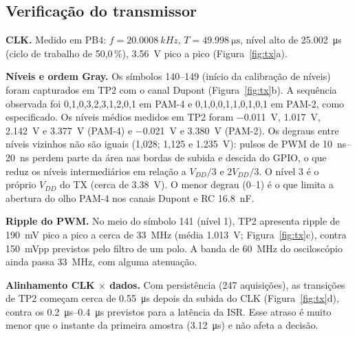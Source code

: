 \documentclass[12pt,a4paper]{article}
\begin{document}
\subsection{Verificação do transmissor}

\textbf{CLK.} Medido em PB4: $f = \SI{20,0008}{kHz}$, $T = \SI{49,998}{\micro\second}$, nível
alto de \SI{25,002}{\micro\second} (ciclo de trabalho de 50,0\,\%), \SI{3,56}{V} pico a pico
(Figura~\ref{fig:tx}a).

\textbf{Níveis e ordem Gray.} Os símbolos 140--149 (início da calibração de níveis) foram capturados
em TP2 com o canal Dupont (Figura~\ref{fig:tx}b). A sequência observada foi 0,1,0,3,2,3,1,2,0,1 em
PAM-4 e 0,1,0,0,1,1,0,1,0,1 em PAM-2, como especificado. Os níveis médios medidos em TP2 foram
\SI{-0,011}{V}, \SI{1,017}{V}, \SI{2,142}{V} e \SI{3,377}{V} (PAM-4) e \SI{-0,021}{V} e
\SI{3,380}{V} (PAM-2). Os degraus entre níveis vizinhos não são iguais (1,028; 1,125 e
\SI{1,235}{V}): pulsos de PWM de \SIrange{10}{20}{ns} perdem parte da área nas bordas de subida e
descida do GPIO, o que reduz os níveis intermediários em relação a $V_{DD}/3$ e $2V_{DD}/3$. O nível 3
é o próprio $V_{DD}$ do TX (cerca de \SI{3,38}{V}). O menor degrau (0--1) é o que limita a abertura
do olho PAM-4 nos canais Dupont e RC \SI{16,8}{nF}.

\textbf{Ripple do PWM.} No meio do símbolo 141 (nível 1), TP2 apresenta ripple de
\SI{190}{mV} pico a pico a cerca de \SI{33}{MHz} (média \SI{1,013}{V}; Figura~\ref{fig:tx}c), contra
\SI{150}{mVpp} previstos pelo filtro de um polo. A banda de \SI{60}{MHz} do osciloscópio ainda passa
\SI{33}{MHz}, com alguma atenuação.

\textbf{Alinhamento CLK $\times$ dados.} Com persistência (247 aquisições), as transições de TP2
começam cerca de \SI{0,55}{\micro\second} depois da subida do CLK (Figura~\ref{fig:tx}d), contra os
\SIrange{0,2}{0,4}{\micro\second} previstos para a latência da ISR. Esse atraso é muito menor que o
instante da primeira amostra (\SI{3,12}{\micro\second}) e não afeta a decisão.
\end{document}
